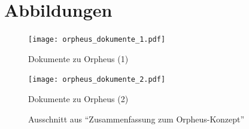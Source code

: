 \documentclass[a5paper,pagesize,numbers=noenddot]{scrbook}
\begin{document}
\clearpage
{}
\printbibliography


\clearpage
{}
\appendix
\renewcommand{\thefigure}{\arabic{figure}}

\chapter{Abbildungen}\label{ch:anhang_abbildungen}
\begin{figure}
   \centering
   \texttt{[image: orpheus\_dokumente\_1.pdf]}
   \caption{Dokumente zu Orpheus (1)}
   \label{fig:orpheus_dokumente_1}
\end{figure}

\begin{figure}
   \centering
   \texttt{[image: orpheus\_dokumente\_2.pdf]}
   \caption{Dokumente zu Orpheus (2)}
   \label{fig:orpheus_dokumente_2}
\end{figure}

\begin{figure}
   \centering
   \caption{Ausschnitt aus \enquote{Zusammenfassung zum Orpheus-Konzept}}
   \label{fig:orpheus_spielfigurenanimation}
\end{figure}
\end{document}
